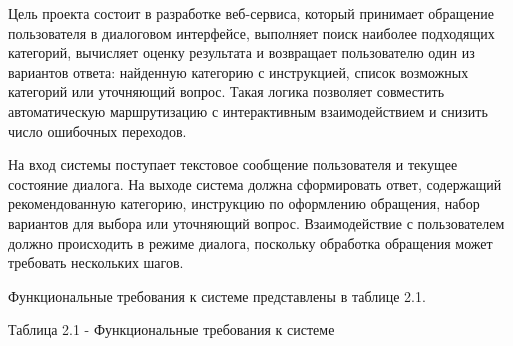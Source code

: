 \documentclass[14pt,a4paper]{extarticle}
\renewcommand{\textbf}[1]{#1}
\numberwithin{figure}{section}
\numberwithin{table}{section}
\begin{document}
Цель проекта состоит в разработке веб-сервиса, который принимает
обращение пользователя в диалоговом интерфейсе, выполняет поиск наиболее
подходящих категорий, вычисляет оценку результата и возвращает
пользователю один из вариантов ответа: найденную категорию с
инструкцией, список возможных категорий или уточняющий вопрос. Такая
логика позволяет совместить автоматическую маршрутизацию с интерактивным
взаимодействием и снизить число ошибочных переходов.

На вход системы поступает текстовое сообщение пользователя и текущее
состояние диалога. На выходе система должна сформировать ответ,
содержащий рекомендованную категорию, инструкцию по оформлению
обращения, набор вариантов для выбора или уточняющий вопрос.
Взаимодействие с пользователем должно происходить в режиме диалога,
поскольку обработка обращения может требовать нескольких шагов.

Функциональные требования к системе представлены в таблице 2.1.

\textbf{Таблица 2.1 - Функциональные требования к системе}
\end{document}
